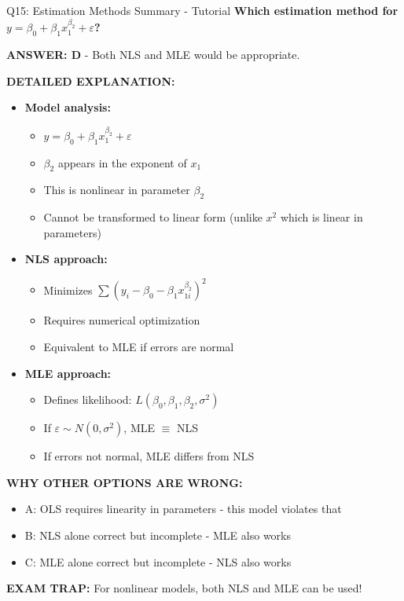 \documentclass[8pt]{beamer}
\begin{document}
	\begin{frame}{Q15: Estimation Methods Summary - Tutorial}
		\fontsize{6.5}{7.5}\selectfont
		\textbf{Which estimation method for $y = \beta_0 + \beta_1 x_1^{\beta_2} + \varepsilon$?}
		
		\vspace{0.05cm}
		\textcolor{myblue}{\textbf{ANSWER: D}} - Both NLS and MLE would be appropriate.
		
		\vspace{0.05cm}
		\textbf{DETAILED EXPLANATION:}
		\begin{itemize}
			\item \textbf{Model analysis:}
			\begin{itemize}
				\item $y = \beta_0 + \beta_1 x_1^{\beta_2} + \varepsilon$
				\item $\beta_2$ appears in the exponent of $x_1$
				\item This is nonlinear in parameter $\beta_2$
				\item Cannot be transformed to linear form (unlike $x^2$ which is linear in parameters)
			\end{itemize}
			\item \textbf{NLS approach:}
			\begin{itemize}
				\item Minimizes $\sum (y_i - \beta_0 - \beta_1 x_{1i}^{\beta_2})^2$
				\item Requires numerical optimization
				\item Equivalent to MLE if errors are normal
			\end{itemize}
			\item \textbf{MLE approach:}
			\begin{itemize}
				\item Defines likelihood: $L(\beta_0, \beta_1, \beta_2, \sigma^2)$
				\item If $\varepsilon \sim N(0, \sigma^2)$, MLE $\equiv$ NLS
				\item If errors not normal, MLE differs from NLS
			\end{itemize}
		\end{itemize}
		
		\vspace{0.05cm}
		\textcolor{myred}{\textbf{WHY OTHER OPTIONS ARE WRONG:}}
		\begin{itemize}
			\item \textcolor{myred}{A:} OLS requires linearity in parameters - this model violates that
			\item \textcolor{myred}{B:} NLS alone correct but incomplete - MLE also works
			\item \textcolor{myred}{C:} MLE alone correct but incomplete - NLS also works
		\end{itemize}
		
		\textcolor{myred}{\textbf{EXAM TRAP:}} For nonlinear models, both \textcolor{myblue}{NLS and MLE} can be used!
	\end{frame}
	
\end{document}
